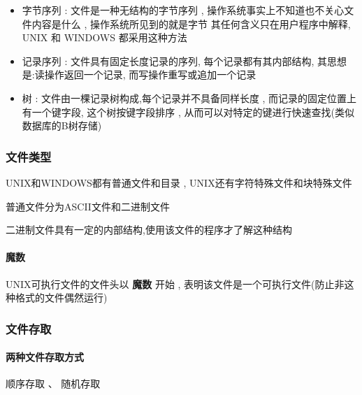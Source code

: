 \documentclass[UTF8,a4paper]{ctexart}
\begin{document}
\begin{itemize}
	\item 字节序列 : 文件是一种无结构的字节序列 , 操作系统事实上不知道也不关心文件内容是什么 , 操作系统所见到的就是字节  其任何含义只在用户程序中解释, UNIX 和 WINDOWS 都采用这种方法
	\item 记录序列 : 文件具有固定长度记录的序列, 每个记录都有其内部结构, 其思想是:读操作返回一个记录, 而写操作重写或追加一个记录
	\item 树 : 文件由一棵记录树构成,每个记录并不具备同样长度 , 而记录的固定位置上有一个键字段, 这个树按键字段排序 , 从而可以对特定的键进行快速查找(类似数据库的B树存储)
\end{itemize}

\subsubsection{文件类型} 
UNIX和WINDOWS都有普通文件和目录 , UNIX还有字符特殊文件和块特殊文件

普通文件分为ASCII文件和二进制文件

二进制文件具有一定的内部结构,使用该文件的程序才了解这种结构

\paragraph{魔数} UNIX可执行文件的文件头以 \textbf{魔数} 开始 , 表明该文件是一个可执行文件(防止非这种格式的文件偶然运行)

\subsubsection{文件存取} 
\paragraph{两种文件存取方式} 顺序存取 、 随机存取
\end{document}
